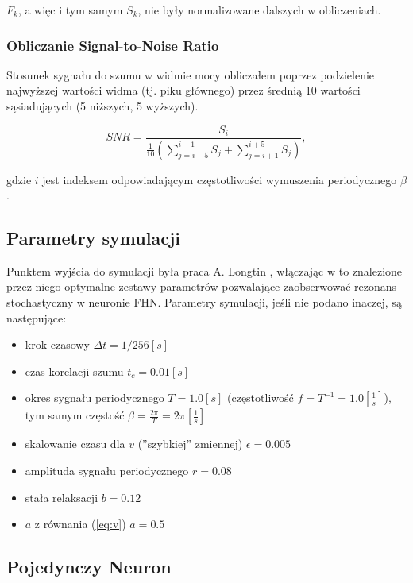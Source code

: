   $F_k$, a więc i tym samym $S_k$, nie były normalizowane dalszych w obliczeniach.

  \subsubsection{Obliczanie Signal-to-Noise Ratio}

  Stosunek sygnału do szumu w widmie mocy obliczałem poprzez podzielenie najwyższej wartości widma (tj. piku głównego) przez średnią 10 wartości sąsiadujących (5 niższych, 5 wyższych).

  \begin{equation}
    SNR = \frac{S_i}{\frac{1}{10} \left ( \sum\limits^{i-1}_{j=i-5} S_j + \sum\limits^{i+5}_{j=i+1} S_j \right )} ,
  \end{equation}

  gdzie $i$ jest indeksem odpowiadającym częstotliwości wymuszenia periodycznego $\beta$.

  \subsection{Parametry symulacji}
  \label{sec:parametry}

  Punktem wyjścia do symulacji była praca A. Longtin \cite{longtin}, włączając w to znalezione przez niego optymalne zestawy parametrów pozwalające zaobserwować rezonans stochastyczny w neuronie FHN. Parametry symulacji, jeśli nie podano inaczej, są następujące:

  \begin{itemize}
    \item krok czasowy $\Delta t = 1/256 [s]$
    \item czas korelacji szumu $t_c = 0.01 [s]$
    \item okres sygnału periodycznego $T=1.0 [s]$ (częstotliwość $f=T^{-1}=1.0 [\frac{1}{s}]$), tym samym częstość $\beta = \frac{2 \pi}{T} = 2 \pi [\frac{1}{s}] $
    \item skalowanie czasu dla $v$ (''szybkiej'' zmiennej) $\epsilon = 0.005$
    \item amplituda sygnału periodycznego $r=0.08$
    \item stała relaksacji $b=0.12$
    \item $a$ z równania (\ref{eq:v}) $a=0.5$
  \end{itemize}

  \subsection{Pojedynczy Neuron}

